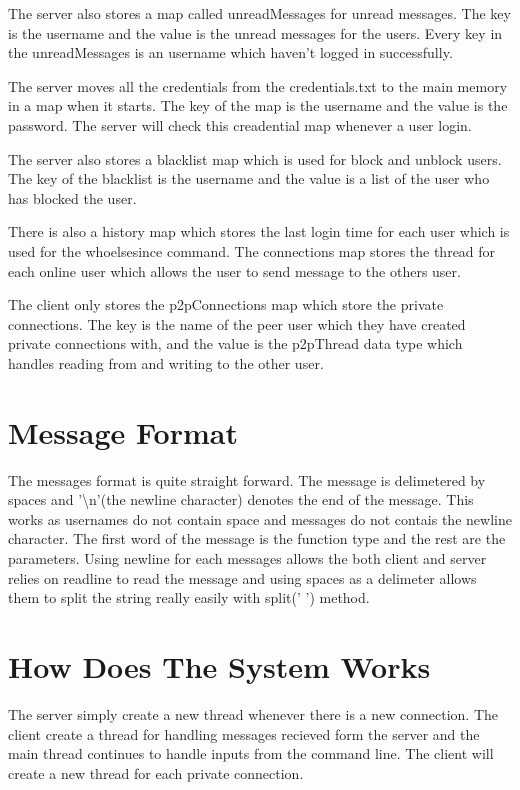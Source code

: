 \documentclass[10pt]{article}
\begin{document}
The server also stores a map called unreadMessages for unread messages. The key is the username and the value is the unread messages for the users. Every key in the unreadMessages is an username which haven't logged in successfully. 

The server moves all the credentials from the credentials.txt to the main memory in a map when it starts. The key of the map is the username and the value is the password. The server will check this creadential map whenever a user login.

The server also stores a blacklist map which is used for block and unblock users. The key of the blacklist is the username and the value is a list of the user who has blocked the user.

There is also a history map which stores the last login time for each user which is used for the whoelsesince command. The connections map stores the thread for each online user which allows the user to send message to the others user.

The client only stores the p2pConnections map which store the private connections. The key is the name of the peer user which they have created private connections with, and the value is the p2pThread data type which handles reading from and writing to the other user.

\section*{Message Format}
The messages format is quite straight forward. The message is delimetered by spaces and '\textbackslash n'(the newline character) denotes the end of the message. This works as usernames do not contain space and messages do not contais the newline character. The first word of the message is the function type and the rest are the parameters. Using newline for each messages allows the both client and server relies on readline to read the message and using spaces as a delimeter allows them to split the string really easily with split(' ') method.

\section*{How Does The System Works}
The server simply create a new thread whenever there is a new connection. The client create a thread for handling messages recieved form the server and the main thread continues to handle inputs from the command line. The client will create a new thread for each private connection.
\end{document}
